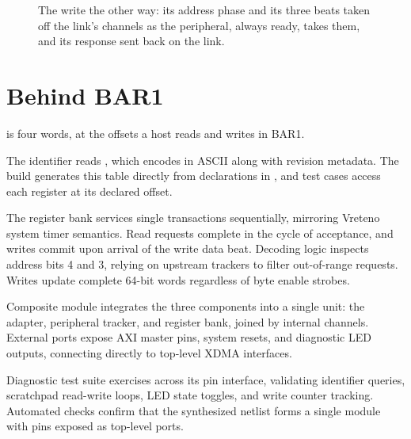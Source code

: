 \documentclass[journal,9pt]{IEEEtran}
\newcommand{\barpart}[3]{%
}
\begin{document}




\begin{figure}[htbp]
\centering

\caption{The write the other way: its address phase and its three
beats taken off the link's channels as the peripheral, always ready,
takes them, and its response sent back on the link.}
\label{fig:p-perpins}
\end{figure}

\section{Behind BAR1}
\label{sec:p-bar}

 is four words, at the offsets a host reads and writes in
BAR1.


The identifier reads , which encodes  in ASCII
along with revision metadata. The build generates this table directly from
 declarations in , and test cases access each register
at its declared offset.

The register bank services single transactions sequentially, mirroring Vreteno
system timer semantics. Read requests complete in the cycle of acceptance, and
writes commit upon arrival of the write data beat. Decoding logic inspects
address bits 4 and 3, relying on upstream trackers to filter out-of-range
requests. Writes update complete 64-bit words regardless of byte enable strobes.

\barpart{regs}{\code{BarRegs}: four words behind a peripheral
tracker.}{lst:p-regs}

Composite module  integrates the three components into a single
unit: the  adapter, peripheral tracker, and register bank, joined
by internal channels. External ports expose AXI master pins, system resets, and
diagnostic LED outputs, connecting directly to top-level XDMA interfaces.

\barpart{bar}{\code{PcieBar}: everything behind BAR1, as one
unit.}{lst:p-bar}

Diagnostic test suite  exercises  across
its pin interface, validating identifier queries, scratchpad read-write loops,
LED state toggles, and write counter tracking. Automated checks confirm that the
synthesized netlist forms a single module with pins exposed as top-level ports.
\end{document}
